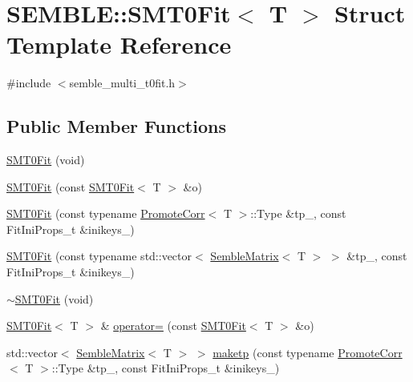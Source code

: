 \hypertarget{structSEMBLE_1_1SMT0Fit}{}\section{S\+E\+M\+B\+LE\+:\+:S\+M\+T0\+Fit$<$ T $>$ Struct Template Reference}
\label{structSEMBLE_1_1SMT0Fit}


{\ttfamily \#include $<$semble\+\_\+multi\+\_\+t0fit.\+h$>$}

\subsection*{Public Member Functions}
\begin{DoxyCompactItemize}
\item 
\mbox{\hyperlink{structSEMBLE_1_1SMT0Fit_a7fe742a611df3fc26dfde896488115e8}{S\+M\+T0\+Fit}} (void)
\item 
\mbox{\hyperlink{structSEMBLE_1_1SMT0Fit_a90127081fe33f0fe4cab0bbb2060b04e}{S\+M\+T0\+Fit}} (const \mbox{\hyperlink{structSEMBLE_1_1SMT0Fit}{S\+M\+T0\+Fit}}$<$ T $>$ \&o)
\item 
\mbox{\hyperlink{structSEMBLE_1_1SMT0Fit_abadec4f589b30c47e8fbe7d7b821aae9}{S\+M\+T0\+Fit}} (const typename \mbox{\hyperlink{structSEMBLE_1_1PromoteCorr}{Promote\+Corr}}$<$ T $>$\+::Type \&tp\+\_\+, const Fit\+Ini\+Props\+\_\+t \&inikeys\+\_\+)
\item 
\mbox{\hyperlink{structSEMBLE_1_1SMT0Fit_a048a03a78f499dc1186691afc5ff770d}{S\+M\+T0\+Fit}} (const typename std\+::vector$<$ \mbox{\hyperlink{structSEMBLE_1_1SembleMatrix}{Semble\+Matrix}}$<$ T $>$ $>$ \&tp\+\_\+, const Fit\+Ini\+Props\+\_\+t \&inikeys\+\_\+)
\item 
\mbox{\hyperlink{structSEMBLE_1_1SMT0Fit_af661fa33d8fba83dbbc1f08f4c15c04e}{$\sim$\+S\+M\+T0\+Fit}} (void)
\item 
\mbox{\hyperlink{structSEMBLE_1_1SMT0Fit}{S\+M\+T0\+Fit}}$<$ T $>$ \& \mbox{\hyperlink{structSEMBLE_1_1SMT0Fit_a7fbbf0aedac972669c1c3c7102a1af4e}{operator=}} (const \mbox{\hyperlink{structSEMBLE_1_1SMT0Fit}{S\+M\+T0\+Fit}}$<$ T $>$ \&o)
\item 
std\+::vector$<$ \mbox{\hyperlink{structSEMBLE_1_1SembleMatrix}{Semble\+Matrix}}$<$ T $>$ $>$ \mbox{\hyperlink{structSEMBLE_1_1SMT0Fit_a5b041e77bdb163f84968938f3f2a3850}{maketp}} (const typename \mbox{\hyperlink{structSEMBLE_1_1PromoteCorr}{Promote\+Corr}}$<$ T $>$\+::Type \&tp\+\_\+, const Fit\+Ini\+Props\+\_\+t \&inikeys\+\_\+)
\item 

\end{DoxyCompactItemize}
